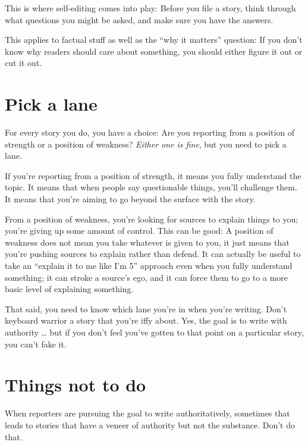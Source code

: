 \documentclass[
  12pt,
  american,
  letterpaperpaper,
  extrafontsizes,onecolumn,openright
  ]{memoir}
\newlength{\rf}
\begin{document}
This is where self-editing comes into play: Before you file a story, think through what questions you might be asked, and make sure you have the answers.

This applies to factual stuff as well as the \enquote{why it matters} question: If you don't know why readers should care about something, you should either figure it out or cut it out.

\hypertarget{pick-a-lane}{%
\section*{Pick a lane}\label{pick-a-lane}}

For every story you do, you have a choice: Are you reporting from a position of strength or a position of weakness? \emph{Either one is fine}, but you need to pick a lane.

If you're reporting from a position of strength, it means you fully understand the topic. It means that when people say questionable things, you'll challenge them. It means that you're aiming to go beyond the surface with the story.

From a position of weakness, you're looking for sources to explain things to you; you're giving up some amount of control. This can be good: A position of weakness does not mean you take whatever is given to you, it just means that you're pushing sources to explain rather than defend. It can actually be useful to take an \enquote{explain it to me like I'm 5} approach even when you fully understand something; it can stroke a source's ego, and it can force them to go to a more basic level of explaining something.

That said, you need to know which lane you're in when you're writing. Don't keyboard warrior a story that you're iffy about. Yes, the goal is to write with authority \ldots{} but if you don't feel you've gotten to that point on a particular story, you can't fake it.

\hypertarget{things-not-to-do-1}{%
\section*{Things not to do}\label{things-not-to-do-1}}

When reporters are pursuing the goal to write authoritatively, sometimes that leads to stories that have a veneer of authority but not the substance. Don't do that.
\end{document}
